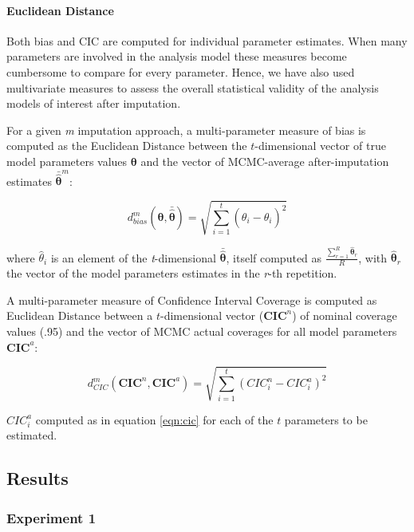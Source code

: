 	\paragraph{Euclidean Distance}
	Both bias and CIC are computed for individual parameter estimates. 
	When many parameters are involved in the analysis model these measures become cumbersome to compare for every 
	parameter.
	Hence, we have also used multivariate measures to assess the overall statistical validity of the analysis 
	models of interest after imputation.

	For a given \emph{m} imputation approach, a multi-parameter measure of bias is computed as the Euclidean 
	Distance between the $t$-dimensional vector of true model parameters values $\bm{\theta}$ and the vector 
	of MCMC-average after-imputation estimates 
	$\bar{\hat{\bm{\theta}}}^{m}$:

	\begin{equation} \label{eqn:ed}
		d^{m}_{bias}(\bm{\theta},\bar{\hat{\bm{\theta}}}) =  
			\sqrt{ \sum_{i=1}^{t} (\theta_i - \hat{\theta}_i)^2 }
	\end{equation}
	
	where $\hat{\theta}_i$ is an element of the \emph{t}-dimensional $\bar{\hat{\bm{\theta}}}$, itself computed as 
	$\frac{ \sum_{r=1}^{R} \hat{\bm{\theta}}_r }{R}$, with $\hat{\bm{\theta}}_r$ the vector of the model parameters 
	estimates in the \emph{r}-th repetition.

	A multi-parameter measure of Confidence Interval Coverage is computed as Euclidean Distance between a 
	$t$-dimensional vector ($\bm{CIC}^{n}$) of nominal coverage values (.95) and the vector of MCMC actual
	coverages for all model parameters $\bm{CIC}^{a}$:

	\begin{equation} \label{eqn:ed}
		d^{m}_{CIC}(\bm{CIC}^{n}, \bm{CIC}^{a}) =  
			\sqrt{ \sum_{i=1}^{t} (CIC^{n}_i - CIC^{a}_i)^2 }
	\end{equation}
	
	${CIC}^{a}_i$ computed as in equation \ref{eqn:cic} for each of the $t$ parameters to be estimated.

\subsection{Results}

\subsubsection{Experiment 1}

